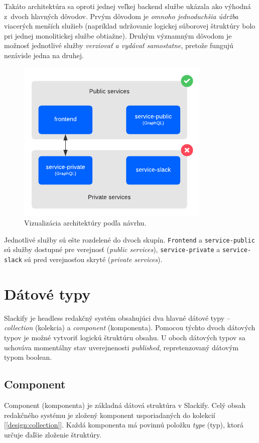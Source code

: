 \noindent Takáto architektúra sa oproti jednej veľkej backend službe ukázala ako výhodná z~dvoch hlavných dôvodov. Prvým dôvodom je \emph{omnoho jednoduchšia údržba} viacerých menších služieb (napríklad udržovanie logickej súborovej štruktúry bolo pri jednej monolitickej službe obtiažne). Druhým významným dôvodom je možnosť jednotlivé služby \emph{verziovať a vydávať samostatne}, pretože fungujú nezávisle jedna na druhej.


\begin{figure}[h]
	\centering
	\includegraphics[scale=1.4]{obrazky-figures/architecture}
	\caption{Vizualizácia architektúry podľa návrhu.}
\end{figure}

Jednotlivé služby sú ešte rozdelené do dvoch skupín. \texttt{Frontend} a \texttt{service-public} sú služby dostupné pre verejnosť (\emph{public services}), \texttt{service-private} a \texttt{service-slack} sú pred verejnosťou skryté (\emph{private services}). 

\section{Dátové typy}
\label{theory:data_types}
Slackify je headless redakčný systém obsahujúci dva hlavné dátové typy -- \emph{collection} (kolekcia) a \emph{component} (komponenta). Pomocou týchto dvoch dátových typov je možné vytvoriť logickú štruktúru obsahu. U oboch dátových typov sa uchováva momentálny stav uverejnenosti \emph{published}, repretenzovaný dátovým typom boolean.

\subsection{Component}
Component (komponenta) je základná dátová struktúra v Slackify. Celý obsah redakčného systému je zložený komponent usporiadaných do kolekcií [\ref{design:collection}]. Každá komponenta má povinnú položku \emph{type} (typ), ktorá určuje ďaľšie zloženie štruktúry.

